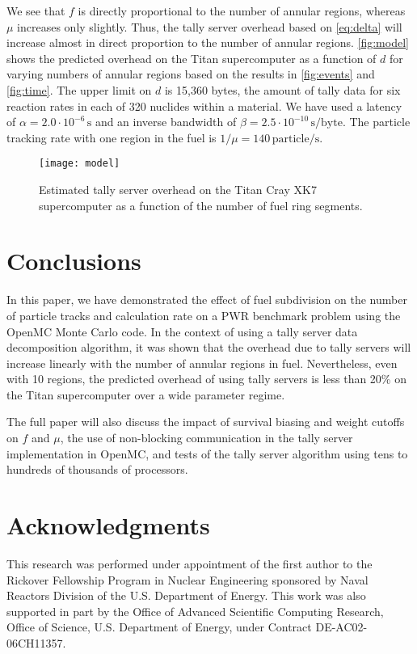 \documentclass{snamc2013}
\newcommand{\unit}[1]{\ensuremath{\, \mathrm{#1}}}
\begin{document}
We see that $f$ is directly proportional to the number of annular regions,
whereas $\mu$ increases only slightly. Thus, the tally server overhead based on
\eqref{eq:delta} will increase almost in direct proportion to the number of
annular regions. \autoref{fig:model} shows the predicted overhead on the Titan
supercomputer as a function of $d$ for varying numbers of annular regions based
on the results in \autoref{fig:events} and \autoref{fig:time}. The upper limit
on $d$ is 15,360 bytes, the amount of tally data for six reaction rates in each
of 320 nuclides within a material. We have used a latency of $\alpha = 2.0 \cdot
10^{-6} \unit{s}$ and an inverse bandwidth of $\beta = 2.5 \cdot 10^{-10}
\unit{s/byte}$. The particle tracking rate with one region in the fuel is $1/\mu
= 140 \unit{particle/s}$.
\begin{figure}[htb]
  \centering
  \texttt{[image: model]}
  \caption{Estimated tally server overhead on the Titan Cray XK7 supercomputer
    as a function of the number of fuel ring segments.}
  \label{fig:model}
\end{figure}

\section{Conclusions}

In this paper, we have demonstrated the effect of fuel subdivision on the number
of particle tracks and calculation rate on a PWR benchmark problem using the
OpenMC Monte Carlo code. In the context of using a tally server data
decomposition algorithm, it was shown that the overhead due to tally servers
will increase linearly with the number of annular regions in fuel. Nevertheless,
even with 10 regions, the predicted overhead of using tally servers is less than
20\% on the Titan supercomputer over a wide parameter regime.

The full paper will also discuss the impact of survival biasing and weight
cutoffs on $f$ and $\mu$, the use of non-blocking communication in the tally
server implementation in OpenMC, and tests of the tally server algorithm using
tens to hundreds of thousands of processors.

\section*{Acknowledgments}

This research was performed under appointment of the first author to the
Rickover Fellowship Program in Nuclear Engineering sponsored by Naval Reactors
Division of the U.S. Department of Energy. This work was also supported in part
by the Office of Advanced Scientific Computing Research, Office of Science,
U.S. Department of Energy, under Contract DE-AC02-06CH11357.



\end{document}
